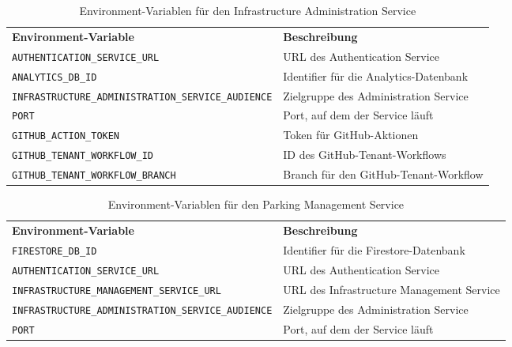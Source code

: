 {
	\begin{longtable}{l p{6cm}}
		\caption{Environment-Variablen für den Infrastructure Administration Service}
		\label{tab:infra-admin-service-env-vars}                                                            \\
		\textbf{Environment-Variable}                              & \textbf{Beschreibung}                  \\ [1ex]
		\texttt{AUTHENTICATION\_SERVICE\_URL}                      & URL des Authentication Service         \\ [0.5ex]
		\texttt{ANALYTICS\_DB\_ID}                                 & Identifier für die Analytics-Datenbank \\ [0.5ex]
		\texttt{INFRASTRUCTURE\_ADMINISTRATION\_SERVICE\_AUDIENCE} & Zielgruppe des Administration Service  \\ [0.5ex]
		\texttt{PORT}                                              & Port, auf dem der Service läuft        \\ [0.5ex]
		\texttt{GITHUB\_ACTION\_TOKEN}                             & Token für GitHub-Aktionen              \\ [0.5ex]
		\texttt{GITHUB\_TENANT\_WORKFLOW\_ID}                      & ID des GitHub-Tenant-Workflows         \\ [0.5ex]
		\texttt{GITHUB\_TENANT\_WORKFLOW\_BRANCH}                  & Branch für den GitHub-Tenant-Workflow  \\
	\end{longtable}}

{
	\begin{longtable}{l p{6cm}}
		\caption{Environment-Variablen für den Parking Management Service}
		\label{tab:parking-mgmt-service-env-vars}                                                              \\
		\textbf{Environment-Variable}                              & \textbf{Beschreibung}                     \\ [1ex]
		\texttt{FIRESTORE\_DB\_ID}                                 & Identifier für die Firestore-Datenbank    \\ [0.5ex]
		\texttt{AUTHENTICATION\_SERVICE\_URL}                      & URL des Authentication Service            \\ [0.5ex]
		\texttt{INFRASTRUCTURE\_MANAGEMENT\_SERVICE\_URL}          & URL des Infrastructure Management Service \\ [0.5ex]
		\texttt{INFRASTRUCTURE\_ADMINISTRATION\_SERVICE\_AUDIENCE} & Zielgruppe des Administration Service     \\ [0.5ex]
		\texttt{PORT}                                              & Port, auf dem der Service läuft           \\
	\end{longtable}}

